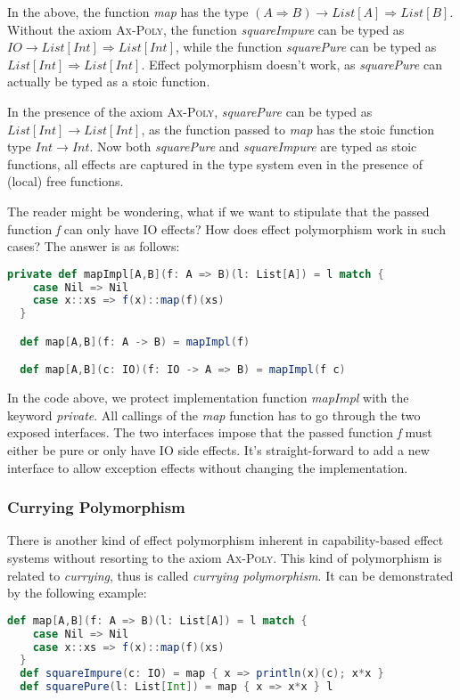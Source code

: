 In the above, the function \emph{map} has the type
$(A \Rightarrow B) \to List[A] \Rightarrow List[B]$. Without the axiom
\textsc{Ax-Poly}, the function \emph{squareImpure} can be typed as
$IO \to List[Int] \Rightarrow List[Int]$, while the function
\emph{squarePure} can be typed as $List[Int] \Rightarrow List[Int]$.
Effect polymorphism doesn't work, as \emph{squarePure} can actually be
typed as a stoic function.

In the presence of the axiom \textsc{Ax-Poly}, \emph{squarePure} can
be typed as $List[Int] \to List[Int]$, as the function passed to
\emph{map} has the stoic function type $Int \to Int$. Now both
\emph{squarePure} and \emph{squareImpure} are typed as stoic
functions, all effects are captured in the type system even in the
presence of (local) free functions.

The reader might be wondering, what if we want to stipulate that the
passed function \emph{f} can only have IO effects? How does effect
polymorphism work in such cases? The answer is as follows:

\begin{lstlisting}[language=Scala]
  private def mapImpl[A,B](f: A => B)(l: List[A]) = l match {
    case Nil => Nil
    case x::xs => f(x)::map(f)(xs)
  }

  def map[A,B](f: A -> B) = mapImpl(f)

  def map[A,B](c: IO)(f: IO -> A => B) = mapImpl(f c)
\end{lstlisting}

In the code above, we protect implementation function \emph{mapImpl}
with the keyword \emph{private}.  All callings of the \emph{map}
function has to go through the two exposed interfaces. The two
interfaces impose that the passed function \emph{f} must either be
pure or only have IO side effects. It's straight-forward to add a new
interface to allow exception effects without changing the
implementation.

\subsubsection{Currying Polymorphism}

There is another kind of effect polymorphism inherent in
capability-based effect systems without resorting to the axiom
\textsc{Ax-Poly}. This kind of polymorphism is related to
\emph{currying}, thus is called \emph{currying polymorphism}. It can
be demonstrated by the following example:

\begin{lstlisting}[language=Scala]
  def map[A,B](f: A => B)(l: List[A]) = l match {
    case Nil => Nil
    case x::xs => f(x)::map(f)(xs)
  }
  def squareImpure(c: IO) = map { x => println(x)(c); x*x }
  def squarePure(l: List[Int]) = map { x => x*x } l
\end{lstlisting}

